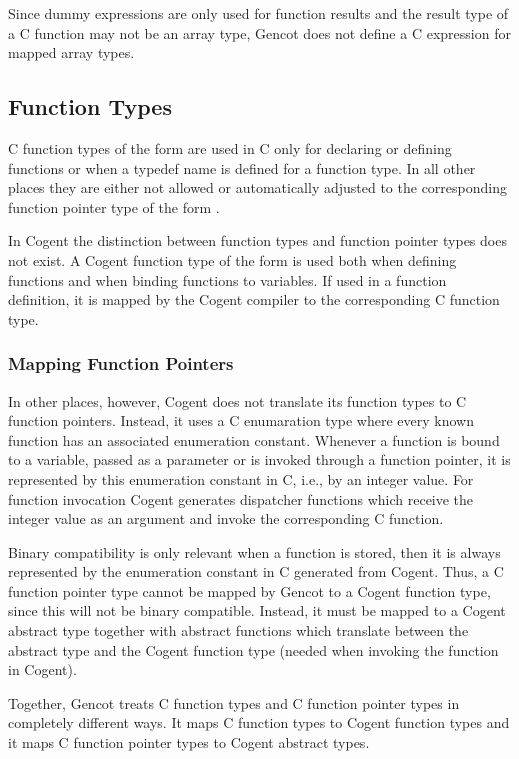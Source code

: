Since dummy expressions are only used for function results and the result type of a C function may not be an array 
type, Gencot does not define a C expression for mapped array types.

\subsection{Function Types}
\label{design-types-function}

C function types of the form  are used in C only for declaring or defining functions or
when a typedef name is defined for a function type. In all other
places they are either not allowed or automatically adjusted to the corresponding function pointer type
of the form . 

In Cogent the distinction between function types and function pointer types does not exist. 
A Cogent function type of the form  is used both when
defining functions and when binding functions to variables. If used in a function definition, it is mapped by
the Cogent compiler to the corresponding C function type.

\subsubsection{Mapping Function Pointers}

In other places, however, Cogent does not translate its function types to C function pointers. Instead, it uses 
a C enumaration type where 
every known function has an associated enumeration constant. Whenever a function is bound to a variable, passed 
as a parameter or is invoked through a function pointer, it is represented by this enumeration constant in C, i.e., by an integer value.
For function invocation Cogent generates dispatcher functions which receive the integer value as an argument
and invoke the corresponding C function. 

Binary compatibility is only relevant when a function is stored, then it is always represented by the enumeration
constant in C generated from Cogent. Thus, a C function pointer type cannot be 
mapped by Gencot to a Cogent function type,
since this will not be binary compatible. Instead, it must be mapped to a Cogent abstract type together with 
abstract functions which translate between the abstract type and the Cogent function type (needed when invoking 
the function in Cogent).

Together, Gencot treats C function types and C function pointer types in completely different ways. It maps
C function types to Cogent function types and it maps C function pointer types to Cogent abstract types.

